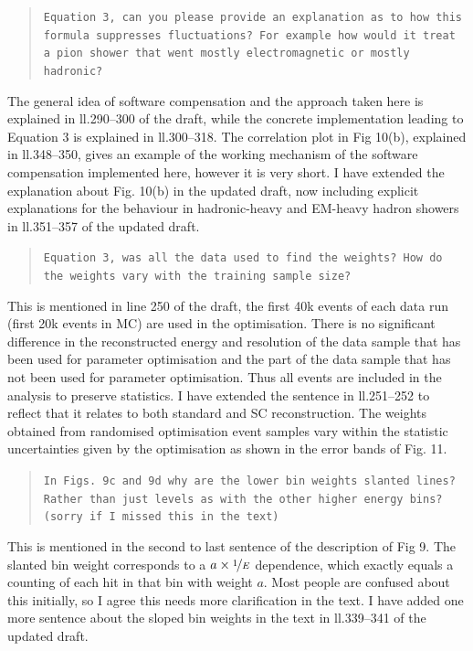 \documentclass[twoside,a4paper,12pt]{article}
\begin{document}
\begin{quote}\texttt{Equation 3, can you please provide an explanation as to how this formula suppresses fluctuations? For example how would it treat a pion shower that went mostly electromagnetic or mostly hadronic?}\end{quote}
The general idea of software compensation and the approach taken here is explained in ll.290--300 of the draft, while the concrete implementation leading to Equation 3 is explained in ll.300--318. The correlation plot in Fig 10(b), explained in ll.348--350, gives an example of the working mechanism of the software compensation implemented here, however it is very short. I have extended the explanation about Fig. 10(b) in the updated draft, now including explicit explanations for the behaviour in hadronic-heavy and EM-heavy hadron showers in ll.351--357 of the updated draft.
 
\begin{quote}\texttt{Equation 3, was all the data used to find the weights?  How do the weights vary with the training sample size?}\end{quote}
This is mentioned in line 250 of the draft, the first 40k events of each data run (first 20k events in MC) are used in the optimisation. There is no significant difference in the reconstructed energy and resolution of the data sample that has been used for parameter optimisation and the part of the data sample that has not been used for parameter optimisation. Thus all events are included in the analysis to preserve statistics. I have extended the sentence in ll.251--252 to reflect that it relates to both standard and SC reconstruction. The weights obtained from randomised optimisation event samples vary within the statistic uncertainties given by the optimisation as shown in the error bands of Fig. 11.

\begin{quote}\texttt{In Figs. 9c and 9d why are the lower bin weights slanted lines?  Rather than just levels as with the other higher energy bins?  (sorry if I missed this in the text)}\end{quote}
This is mentioned in the second to last sentence of the description of Fig 9. The slanted bin weight corresponds to a $a\times\nicefrac{1}{E}$ dependence, which exactly equals a counting of each hit in that bin with weight $a$. Most people are confused about this initially, so I agree this needs more clarification in the text. I have added one more sentence about the sloped bin weights in the text in ll.339--341 of the updated draft.
\end{document}
